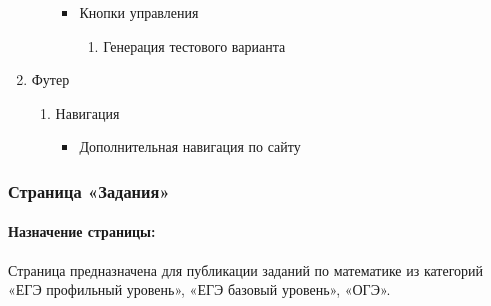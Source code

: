 \begin{enumerate}
\begin{enumerate}
\begin{itemize}
		\item Кнопки управления
		\begin{enumerate}
			\item Генерация тестового варианта
		\end{enumerate}
		\end{itemize}
	\end{enumerate}

	\item Футер
	\begin{enumerate}
		\item Навигация
		\begin{itemize}
			\item Дополнительная навигация по сайту
		\end{itemize}
	\end{enumerate}
\end{enumerate}


\subsubsection{Страница «Задания»}
\paragraph{Назначение страницы:} Страница предназначена для публикации заданий по математике из категорий «ЕГЭ профильный уровень», «ЕГЭ базовый уровень», «ОГЭ».

